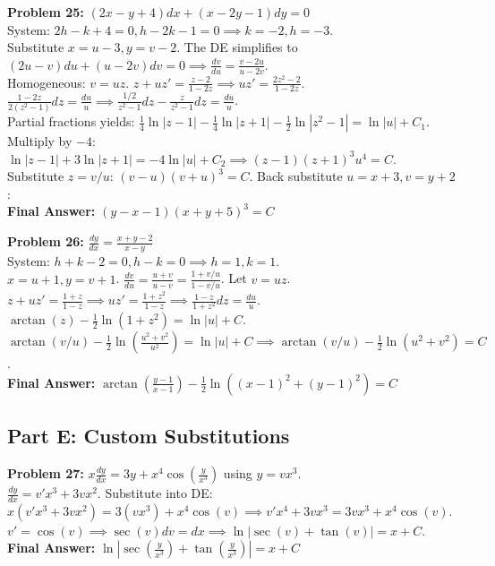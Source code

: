 \documentclass[12pt]{article}
\begin{document}
\textbf{Problem 25:} $(2x-y+4)dx + (x-2y-1)dy = 0$ \\
System: $2h-k+4=0, h-2k-1=0 \implies k=-2, h=-3$. \\
Substitute $x = u-3, y = v-2$. The DE simplifies to $(2u-v)du + (u-2v)dv = 0 \implies \frac{dv}{du} = \frac{v-2u}{u-2v}$. \\
Homogeneous: $v=uz$. $z + uz' = \frac{z-2}{1-2z} \implies uz' = \frac{2z^2-2}{1-2z}$. \\
$\frac{1-2z}{2(z^2-1)}dz = \frac{du}{u} \implies \frac{1/2}{z^2-1}dz - \frac{z}{z^2-1}dz = \frac{du}{u}$. \\
Partial fractions yields: $\frac{1}{4}\ln|z-1| - \frac{1}{4}\ln|z+1| - \frac{1}{2}\ln|z^2-1| = \ln|u| + C_1$. \\
Multiply by $-4$: $\ln|z-1| + 3\ln|z+1| = -4\ln|u| + C_2 \implies (z-1)(z+1)^3 u^4 = C$. \\
Substitute $z=v/u$: $(v-u)(v+u)^3 = C$. Back substitute $u=x+3, v=y+2$: \\
\textbf{Final Answer:} $(y-x-1)(x+y+5)^3 = C$

\vspace{10pt}
\textbf{Problem 26:} $\frac{dy}{dx} = \frac{x+y-2}{x-y}$ \\
System: $h+k-2=0, h-k=0 \implies h=1, k=1$. \\
$x=u+1, y=v+1$. $\frac{dv}{du} = \frac{u+v}{u-v} = \frac{1+v/u}{1-v/u}$. Let $v=uz$. \\
$z + uz' = \frac{1+z}{1-z} \implies uz' = \frac{1+z^2}{1-z} \implies \frac{1-z}{1+z^2}dz = \frac{du}{u}$. \\
$\arctan(z) - \frac{1}{2}\ln(1+z^2) = \ln|u| + C$. \\
$\arctan(v/u) - \frac{1}{2}\ln\left(\frac{u^2+v^2}{u^2}\right) = \ln|u| + C \implies \arctan(v/u) - \frac{1}{2}\ln(u^2+v^2) = C$. \\
\textbf{Final Answer:} $\arctan\left(\frac{y-1}{x-1}\right) - \frac{1}{2}\ln((x-1)^2+(y-1)^2) = C$

\subsection*{Part E: Custom Substitutions}

\textbf{Problem 27:} $x \frac{dy}{dx} = 3y + x^4 \cos\left(\frac{y}{x^3}\right)$ using $y = vx^3$. \\
$\frac{dy}{dx} = v'x^3 + 3vx^2$. Substitute into DE: \\
$x(v'x^3 + 3vx^2) = 3(vx^3) + x^4 \cos(v) \implies v'x^4 + 3vx^3 = 3vx^3 + x^4 \cos(v)$. \\
$v' = \cos(v) \implies \sec(v) dv = dx \implies \ln|\sec(v) + \tan(v)| = x + C$. \\
\textbf{Final Answer:} $\ln\left|\sec\left(\frac{y}{x^3}\right) + \tan\left(\frac{y}{x^3}\right)\right| = x + C$
\end{document}
